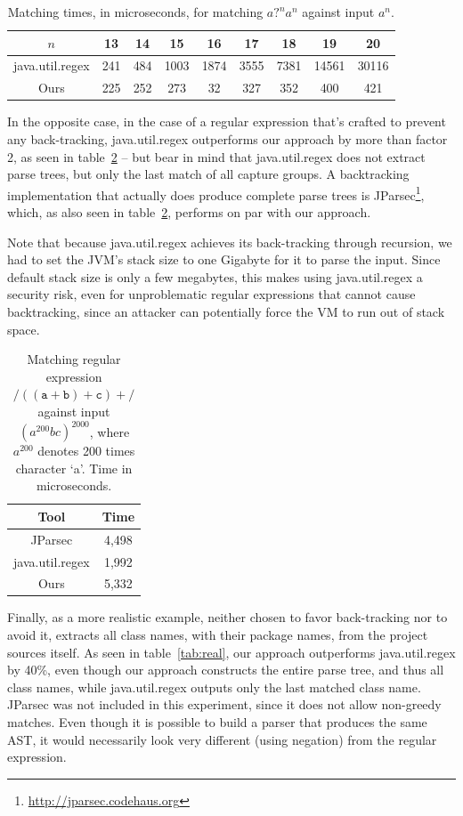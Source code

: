 \documentclass[11pt,a4paper,twoside,openright]{Thesis}
\theoremstyle{definition}
\newcommand{\regex}[1]{\ensuremath{\mathtt{/#1/}}}
\newcommand{\Tabref}[1]{table~\ref{tab:#1}}
\newcommand{\tablabel}[1]{\label{tab:#1}}
\begin{document}
\begin{table}[htb]\center
\begin{tabular}{ccccccccc}
\toprule
$n$ & 13 & 14 & 15 & 16 & 17 & 18 & 19 & 20\tabularnewline
\midrule
java.util.regex & 241 & 484 & 1003 & 1874 & 3555 & 7381 & 14561 & 30116\tabularnewline
Ours & 225 & 252 & 273 & 32 & 327 & 352 & 400 & 421\tabularnewline
\bottomrule
\end{tabular}
\caption[Matching times $\textit{a?}^n\textit{a}^n$ against input $\textit{a}^n$.]{Matching times, in microseconds, for matching
  $\textit{a?}^n\textit{a}^n$ against input $\textit{a}^n$.}
\tablabel{patho}
\end{table}

In the opposite case, in the case of a regular expression that's
crafted to prevent any back-tracking, java.util.regex outperforms
our approach by more than factor 2, as seen in \Tabref{abc} -- but
bear in mind that java.util.regex does not extract parse trees, but
only the last match of all capture groups.  A backtracking
implementation that actually does produce complete parse trees is
JParsec\footnote{\url{http://jparsec.codehaus.org}}, which, as also
seen in \Tabref{abc}, performs on par with our approach.

Note that because java.util.regex achieves its back-tracking through recursion,
we had to set the JVM's stack size to one Gigabyte for it to parse the input.
Since default stack size is only a few megabytes, this makes using
java.util.regex a security risk, even for unproblematic regular expressions
that cannot cause backtracking, since an attacker can potentially force the VM
to run out of stack space.

\begin{table}[htp]\center
\begin{tabular}{cc}
\toprule
Tool & Time\tabularnewline
\midrule
JParsec & 4,498\tabularnewline
java.util.regex & 1,992\tabularnewline
Ours & 5,332\tabularnewline
\bottomrule
\end{tabular}
\caption[Matching times regular expression \regex{((a+b)+c)+} against input $(a^{200}bc)^{2000}$]{
  Matching regular expression \regex{((a+b)+c)+} against input
$(a^{200}bc)^{2000}$, where $a^{200}$ denotes 200 times character `a'. Time in
microseconds.}
\tablabel{abc}
\end{table}

Finally, as a more realistic example, neither chosen to favor
back-tracking nor to avoid it,  extracts all class names, with their
package names, from the project sources itself.  As seen in
\Tabref{real}, our approach outperforms java.util.regex by 40\%,
even though our approach constructs the entire parse tree, and thus
all class names, while java.util.regex outputs only the last matched
class name. JParsec was not included in this experiment, since it does
not allow non-greedy matches. Even though it is possible to build
a parser that produces the same AST, it would necessarily look very
different (using negation) from the regular expression.
\end{document}
